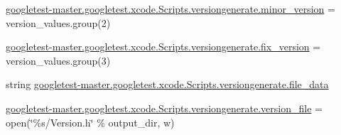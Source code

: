 \begin{DoxyCompactItemize}
\item 
\mbox{\hyperlink{namespacegoogletest-master_1_1googletest_1_1xcode_1_1_scripts_1_1versiongenerate_abf2bc0a85ae4b036d835d14b6633b0e6}{googletest-\/master.\+googletest.\+xcode.\+Scripts.\+versiongenerate.\+minor\+\_\+version}} = version\+\_\+values.\+group(2)
\item 
\mbox{\hyperlink{namespacegoogletest-master_1_1googletest_1_1xcode_1_1_scripts_1_1versiongenerate_ab0c82f8d81eab9ec7a8a86e62666ca71}{googletest-\/master.\+googletest.\+xcode.\+Scripts.\+versiongenerate.\+fix\+\_\+version}} = version\+\_\+values.\+group(3)
\item 
string \mbox{\hyperlink{namespacegoogletest-master_1_1googletest_1_1xcode_1_1_scripts_1_1versiongenerate_ad6a7eb7a90caa5d8cf20303dbb00de8c}{googletest-\/master.\+googletest.\+xcode.\+Scripts.\+versiongenerate.\+file\+\_\+data}}
\item 
\mbox{\hyperlink{namespacegoogletest-master_1_1googletest_1_1xcode_1_1_scripts_1_1versiongenerate_ad94122d5a75c9b1dafb9c082cd1d5a74}{googletest-\/master.\+googletest.\+xcode.\+Scripts.\+versiongenerate.\+version\+\_\+file}} = open(\char`\"{}\%s/Version.\+h\char`\"{} \% output\+\_\+dir, \textquotesingle{}w\textquotesingle{})
\end{DoxyCompactItemize}
